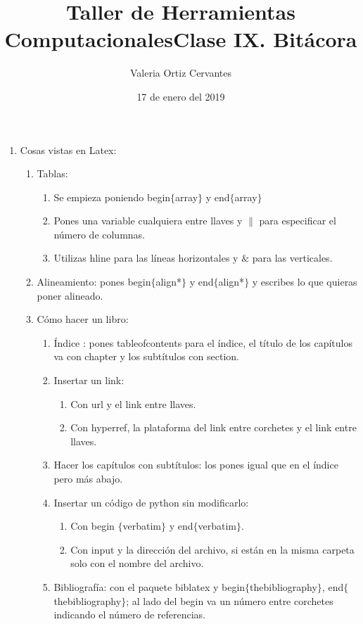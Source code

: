 \documentclass{article}
\title{\Huge Taller de Herramientas Computacionales}
\author{Valeria Ortiz Cervantes}
\date{17 de enero del 2019}
\begin{document}
	\maketitle
	\newpage
	\title{Clase IX. Bitácora\\}
	\begin{enumerate}
		\item Cosas vistas en Latex:
		\begin{enumerate}
			\item Tablas:
			\begin{enumerate}
				\item Se empieza poniendo begin$\{$array$\}$ y end$\{$array$\}$
				\item Pones una variable cualquiera entre llaves y $\|$ para especificar el número de columnas.
				\item Utilizas hline para las líneas horizontales y $\&$ para las verticales.
			\end{enumerate}
			\item Alineamiento: pones begin$\{$align*$\}$ y end$\{$align*$\}$ y escribes lo que quieras poner alineado. 
			\item Cómo hacer un libro:
			\begin{enumerate}
				\item Índice : pones tableofcontents para el índice, el título de los capítulos va con chapter y los subtítulos con section.
				\item Insertar un link: 
				\begin{enumerate}
					\item Con url y el link entre llaves.
					\item Con hyperref, la plataforma del link entre corchetes y el link entre llaves.
				\end{enumerate}
				\item Hacer los capítulos con subtítulos: los pones igual que en el índice pero más abajo.
				\item Insertar un código de python sin modificarlo: 
				\begin{enumerate}
					\item Con begin $\{$verbatim$\}$ y end$\{$verbatim$\}$.
					\item Con input y la dirección del archivo, si están en la misma carpeta solo con el nombre del archivo.
				\end{enumerate}
				\item Bibliografía: con el paquete biblatex y begin$\{$thebibliography$\}$, end$\{$thebibliography$\}$; al lado del begin va un número entre corchetes indicando el número de referencias.

\end{enumerate}
\end{enumerate}
\end{enumerate}
\end{document}
